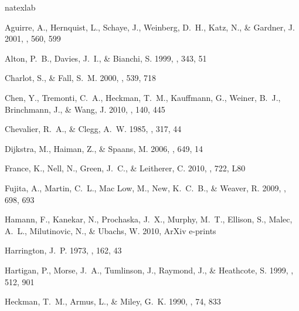 \documentclass[]{emulateapj}
\begin{document}
\begin{thebibliography}{74}
\expandafter\ifx\csname natexlab\endcsname\relax\def\natexlab#1{#1}\fi

{Aguirre}, A., {Hernquist}, L., {Schaye}, J., {Weinberg}, D.~H., {Katz}, N., \&
  {Gardner}, J. 2001, \apj, 560, 599

{Alton}, P.~B., {Davies}, J.~I., \& {Bianchi}, S. 1999, \aap, 343, 51

{Charlot}, S., \& {Fall}, S.~M. 2000, \apj, 539, 718

{Chen}, Y., {Tremonti}, C.~A., {Heckman}, T.~M., {Kauffmann}, G., {Weiner},
  B.~J., {Brinchmann}, J., \& {Wang}, J. 2010, \aj, 140, 445

{Chevalier}, R.~A., \& {Clegg}, A.~W. 1985, \nat, 317, 44

{Dijkstra}, M., {Haiman}, Z., \& {Spaans}, M. 2006, \apj, 649, 14

{France}, K., {Nell}, N., {Green}, J.~C., \& {Leitherer}, C. 2010, \apjl, 722,
  L80

{Fujita}, A., {Martin}, C.~L., {Mac Low}, M., {New}, K.~C.~B., \& {Weaver}, R.
  2009, \apj, 698, 693

{Hamann}, F., {Kanekar}, N., {Prochaska}, J.~X., {Murphy}, M.~T., {Ellison},
  S., {Malec}, A.~L., {Milutinovic}, N., \& {Ubachs}, W. 2010, ArXiv e-prints

{Harrington}, J.~P. 1973, \mnras, 162, 43

{Hartigan}, P., {Morse}, J.~A., {Tumlinson}, J., {Raymond}, J., \& {Heathcote},
  S. 1999, \apj, 512, 901

{Heckman}, T.~M., {Armus}, L., \& {Miley}, G.~K. 1990, \apjs, 74, 833


\end{thebibliography}
\end{document}
